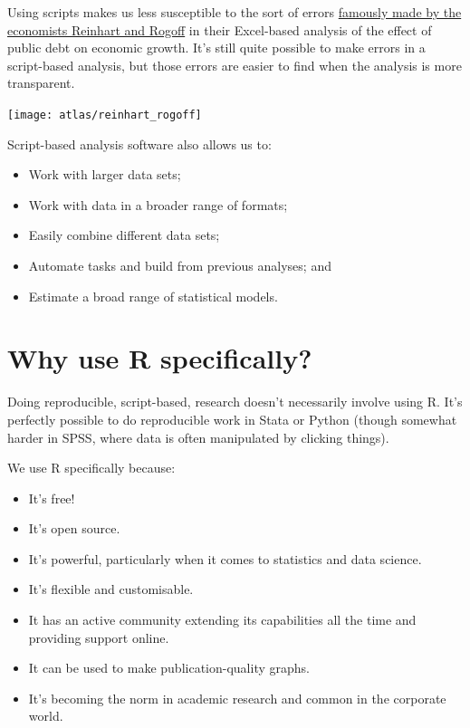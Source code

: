 \documentclass[
]{book}
\providecommand{\tightlist}{%
  \setlength{\itemsep}{0pt}\setlength{\parskip}{0pt}}
\begin{document}
Using scripts makes us less susceptible to the sort of errors \href{https://en.wikipedia.org/wiki/Growth_in_a_Time_of_Debt\#Methodological_flaws}{famously made by the economists Reinhart and Rogoff} in their Excel-based analysis of the effect of public debt on economic growth. It's still quite possible to make errors in a script-based analysis, but those errors are easier to find when the analysis is more transparent.

\texttt{[image: atlas/reinhart\_rogoff]}

Script-based analysis software also allows us to:

\begin{itemize}
\tightlist
\item
  Work with larger data sets;
\item
  Work with data in a broader range of formats;
\item
  Easily combine different data sets;
\item
  Automate tasks and build from previous analyses; and
\item
  Estimate a broad range of statistical models.
\end{itemize}

\hypertarget{why-R}{%
\section{Why use R specifically?}\label{why-R}}

Doing reproducible, script-based, research doesn't necessarily involve using R. It's perfectly possible to do reproducible work in Stata or Python (though somewhat harder in SPSS, where data is often manipulated by clicking things).

We use R specifically because:

\begin{itemize}
\tightlist
\item
  It's free!
\item
  It's open source.
\item
  It's powerful, particularly when it comes to statistics and data science.
\item
  It's flexible and customisable.
\item
  It has an active community extending its capabilities all the time and providing support online.
\item
  It can be used to make publication-quality graphs.
\item
  It's becoming the norm in academic research and common in the corporate world.
\end{itemize}
\end{document}
